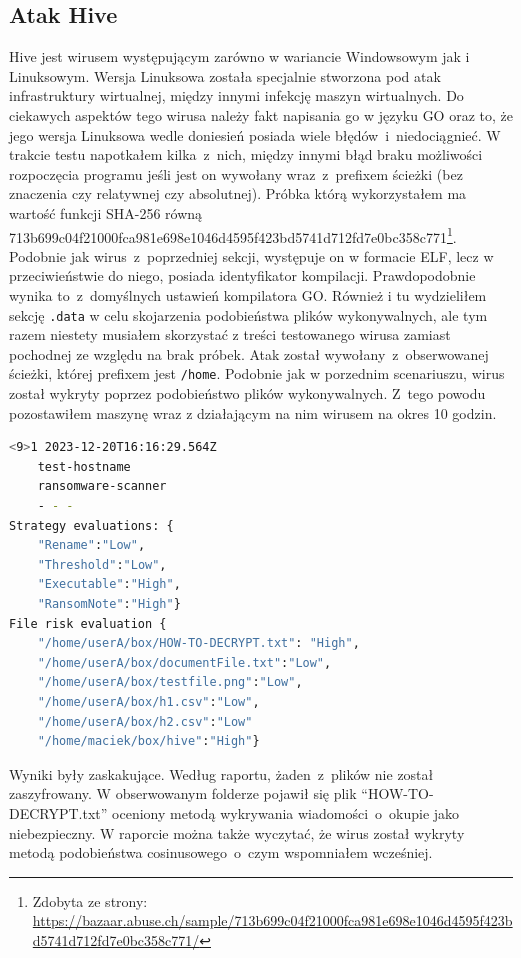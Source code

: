 \subsection{Atak Hive}
Hive jest wirusem występującym zarówno w wariancie Windowsowym 
jak i Linuksowym. 
Wersja Linuksowa została specjalnie stworzona pod atak infrastruktury wirtualnej, między 
innymi infekcję maszyn wirtualnych. Do ciekawych aspektów tego wirusa należy fakt napisania go w języku GO oraz to, że jego wersja Linuksowa wedle doniesień posiada wiele błędów~i~niedociągnieć. W trakcie testu napotkałem kilka~z~nich, między innymi błąd braku możliwości rozpoczęcia programu jeśli jest on wywołany wraz~z~prefixem ścieżki (bez znaczenia czy relatywnej czy absolutnej).
Próbka którą wykorzystałem ma wartość funkcji SHA-256 równą
713b699c04f21000fca981e698e1046d4595f423bd5741d712fd7e0bc358c771\footnote{Zdobyta ze strony: \url{https://bazaar.abuse.ch/sample/713b699c04f21000fca981e698e1046d4595f423bd5741d712fd7e0bc358c771/}}. Podobnie jak wirus~z~poprzedniej sekcji, występuje on w formacie ELF, lecz w przeciwieństwie do niego, posiada identyfikator kompilacji. Prawdopodobnie wynika to~z~domyślnych ustawień kompilatora GO. Również i tu wydzieliłem sekcję \texttt{.data} w celu skojarzenia podobieństwa plików wykonywalnych, ale tym razem niestety musiałem skorzystać z treści testowanego wirusa zamiast pochodnej ze względu na brak próbek. Atak został wywołany~z~obserwowanej ścieżki, której prefixem jest \texttt{/home}. Podobnie jak w porzednim scenariuszu, wirus został wykryty poprzez podobieństwo plików wykonywalnych. Z~tego powodu pozostawiłem maszynę wraz z działającym na nim wirusem na okres 10 godzin.
\begin{lstlisting}[language=bash,
    backgroundcolor=\color{EEGold!5!white},
    caption={Późniejszy raport~z~ataku Hive.},
    label={lst:raportau}]
    <9>1 2023-12-20T16:16:29.564Z
    test-hostname 
    ransomware-scanner 
    - - -  
Strategy evaluations: {
    "Rename":"Low",
    "Threshold":"Low",
    "Executable":"High",
    "RansomNote":"High"}
File risk evaluation {
    "/home/userA/box/HOW-TO-DECRYPT.txt": "High",
    "/home/userA/box/documentFile.txt":"Low",
    "/home/userA/box/testfile.png":"Low",
    "/home/userA/box/h1.csv":"Low",
    "/home/userA/box/h2.csv":"Low"
    "/home/maciek/box/hive":"High"}
\end{lstlisting}
Wyniki były zaskakujące. Według raportu, żaden~z~plików nie został zaszyfrowany. W obserwowanym folderze pojawił się plik \foreignquote{english}{HOW-TO-DECRYPT.txt} oceniony metodą wykrywania wiadomości~o~okupie jako niebezpieczny. W raporcie można także wyczytać, że wirus został wykryty metodą podobieństwa cosinusowego~o~czym wspomniałem wcześniej.\newpage
